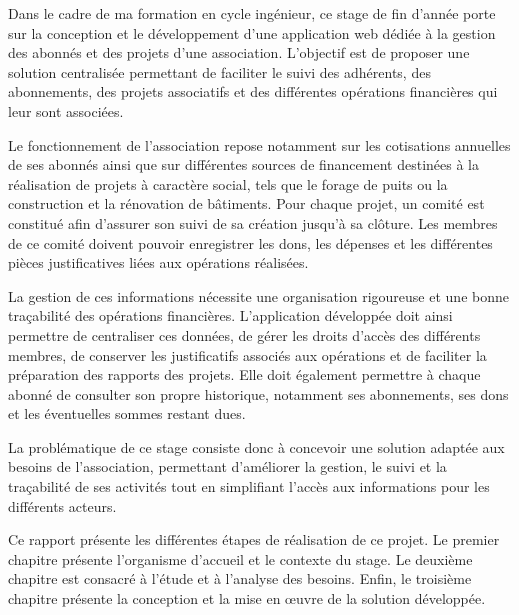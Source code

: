 
Dans le cadre de ma formation en cycle ingénieur, ce stage de fin d'année porte sur la conception et le développement d'une application web dédiée à la gestion des abonnés et des projets d'une association. L'objectif est de proposer une solution centralisée permettant de faciliter le suivi des adhérents, des abonnements, des projets associatifs et des différentes opérations financières qui leur sont associées.

\vspace{0.5cm}

Le fonctionnement de l'association repose notamment sur les cotisations annuelles de ses abonnés ainsi que sur différentes sources de financement destinées à la réalisation de projets à caractère social, tels que le forage de puits ou la construction et la rénovation de bâtiments. Pour chaque projet, un comité est constitué afin d'assurer son suivi de sa création jusqu'à sa clôture. Les membres de ce comité doivent pouvoir enregistrer les dons, les dépenses et les différentes pièces justificatives liées aux opérations réalisées.

\vspace{0.5cm}

La gestion de ces informations nécessite une organisation rigoureuse et une bonne traçabilité des opérations financières. L'application développée doit ainsi permettre de centraliser ces données, de gérer les droits d'accès des différents membres, de conserver les justificatifs associés aux opérations et de faciliter la préparation des rapports des projets. Elle doit également permettre à chaque abonné de consulter son propre historique, notamment ses abonnements, ses dons et les éventuelles sommes restant dues.

\vspace{0.5cm}

La problématique de ce stage consiste donc à concevoir une solution adaptée aux besoins de l'association, permettant d'améliorer la gestion, le suivi et la traçabilité de ses activités tout en simplifiant l'accès aux informations pour les différents acteurs.

\vspace{0.5cm}

Ce rapport présente les différentes étapes de réalisation de ce projet. Le premier chapitre présente l'organisme d'accueil et le contexte du stage. Le deuxième chapitre est consacré à l'étude et à l'analyse des besoins. Enfin, le troisième chapitre présente la conception et la mise en œuvre de la solution développée.
